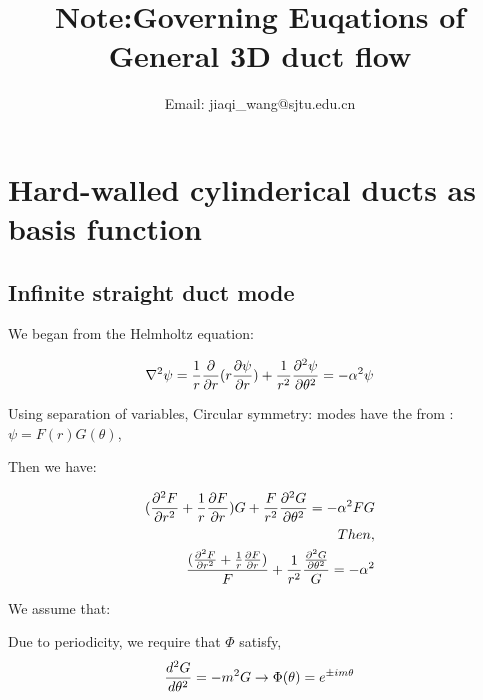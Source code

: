 \documentclass{Note}
\begin{document}
\title{Note:Governing Euqations of General 3D duct flow} 
\author{
     Email: jiaqi\_wang@sjtu.edu.cn
    } 

\maketitle

\section{Hard-walled cylinderical ducts as basis function}
\subsection{Infinite straight duct mode}
We began from the Helmholtz equation:


\begin{equation}
\begin{aligned}
\nabla^2 \psi={1\over r}{\partial \over \partial  r}({ r{\partial \psi\over \partial  r}}) +{1\over  r^2}{\partial ^2 \psi \over \partial \theta^2}=-\alpha^2 \psi
\end{aligned}
\end{equation}

Using separation of variables, Circular symmetry: modes have the from :
$\psi=F(r)G(\theta)$,

Then we have:


\begin{equation}
\begin{aligned}
({\partial^2 F\over \partial r^2}+{1\over r}{\partial F\over \partial r})G+{F\over r^2}{\partial^2 G\over \partial \theta^2}=-\alpha^2 FG\\
Then,\\
{({\partial^2 F\over \partial r^2}+{1\over r}{\partial F\over \partial r})\over F}+{1\over r^2}{{\partial^2 G\over \partial \theta^2}\over G}=-\alpha^2 \\
\end{aligned}
\end{equation}

We assume that:


Due to periodicity, we require that $\Phi$ satisfy, 
\begin{equation}
\begin{aligned}
{d^2 G\over d\theta^2}=-m^2 G\rightarrow \Phi(\theta)=e^{\pm i m \theta}
\end{aligned}
\end{equation}
\end{document}
